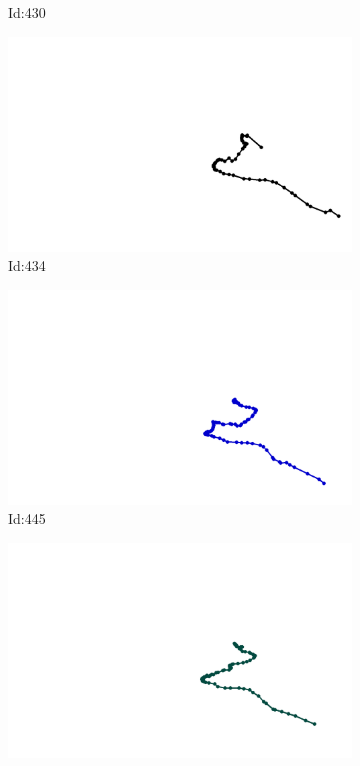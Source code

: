 \documentclass[12pt,twoside]{report}
\begin{document}
\begin{figure}
\begin{subfigure}[b]{0.20\textwidth}
\caption{Id:430}
\end{subfigure}
\begin{subfigure}[b]{0.20\textwidth}
\centering
\includegraphics[width=\textwidth]{../../trajectories/434.png}
\caption{Id:434}
\end{subfigure}
\begin{subfigure}[b]{0.20\textwidth}
\centering
\includegraphics[width=\textwidth]{../../trajectories/445.png}
\caption{Id:445}
\end{subfigure}
\begin{subfigure}[b]{0.20\textwidth}
\centering
\includegraphics[width=\textwidth]{../../trajectories/465.png}

\end{subfigure}
\end{figure}
\end{document}

